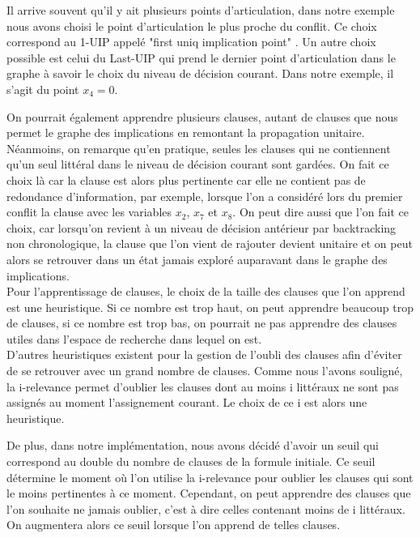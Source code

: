 \documentclass[12pt]{extarticle}
\begin{document}
Il arrive souvent qu'il y ait plusieurs points d'articulation, dans notre exemple nous avons choisi le point d'articulation le plus proche du conflit. Ce choix correspond au 1-UIP appelé "first uniq implication point"%
. Un autre choix possible est celui du Last-UIP 
qui prend le dernier point d'articulation dans le graphe à savoir le choix du niveau de décision courant. Dans notre exemple, il s'agit du point $x_4 = 0$.

On pourrait également apprendre plusieurs clauses, autant de clauses que nous permet le graphe des implications en remontant la propagation unitaire. Néanmoins, on remarque qu'en pratique, seules les clauses qui ne contiennent qu'un seul littéral dans le niveau de décision courant sont gardées. On fait ce choix là car la clause est alors plus pertinente car elle ne contient pas de redondance d'information, par exemple, lorsque l'on a considéré lors du premier conflit la clause avec les variables $x_2$, $x_7$ et $x_8$. On peut dire aussi que l'on fait ce choix, car lorsqu'on revient à un niveau de décision antérieur par backtracking non chronologique, la clause que l'on vient de rajouter devient unitaire et on peut alors se retrouver dans un état jamais exploré auparavant dans le graphe des implications. \\

Pour l'apprentissage de clauses, le choix de la taille des clauses que l'on apprend est une heuristique. Si ce nombre est trop haut, on peut apprendre beaucoup trop de clauses, si ce nombre est trop bas, on pourrait ne pas apprendre des clauses utiles dans l'espace de recherche dans lequel on est. \\

D'autres heuristiques existent pour la gestion de l'oubli des clauses afin d'éviter de se retrouver avec un grand nombre de clauses. Comme nous l'avons souligné, la i-relevance permet d'oublier les clauses dont au moins i littéraux ne sont pas assignés au moment l'assignement courant. Le choix de ce i est alors une heuristique.

De plus, dans notre implémentation, nous avons décidé d'avoir un seuil qui correspond au double du nombre de clauses de la formule initiale. Ce seuil détermine le moment où l'on utilise la i-relevance pour oublier les clauses qui sont le moins pertinentes à ce moment.
Cependant, on peut apprendre des clauses que l'on souhaite ne jamais oublier, c'est à dire celles contenant moins de i littéraux. On augmentera alors ce seuil lorsque l'on apprend de telles clauses. \\
\end{document}
